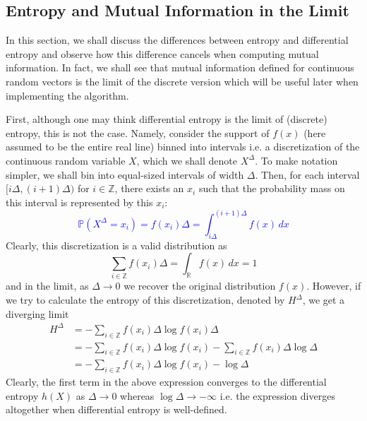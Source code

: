 \documentclass[../Thesis.tex]{subfiles}
\begin{document}
\subsection{Entropy and Mutual Information in the Limit}\label{subsec:limit entropy and MI}
In this section, we shall discuss the differences between entropy and differential entropy and observe how this difference cancels when computing mutual information. In fact, we shall see that mutual information defined for continuous random vectors is the limit of the discrete version which will be useful later when implementing the algorithm.

First, although one may think differential entropy is the limit of (discrete) entropy, this is not the case. Namely, consider the support of $f(x)$ (here assumed to be the entire real line) binned into intervals i.e. a discretization of the continuous random variable $X$, which we shall denote $X^{\Delta}$. To make notation simpler, we shall bin into equal-sized intervals of width $\Delta$. Then, for each interval $[i\Delta, (i+1)\Delta)$ for $i \in \mathbb{Z}$, there exists an $x_i$ such that the probability mass on this interval is represented by this $x_i$:
\textcolor{blue}{
    \begin{equation}\label{eq:one dim discretization}
        \mathbb{P}\left(X^{\Delta} = x_i\right) = f(x_i) \Delta = \int_{i\Delta}^{(i+1)\Delta} f(x) \, dx
    \end{equation}
}
Clearly, this discretization is a valid distribution as
$$\sum_{i\in\mathbb{Z}} f(x_i) \Delta = \int_{\mathbb{R}} f(x) \, dx = 1$$
and in the limit, as $\Delta \to 0$ we recover the original distribution $f(x)$. However, if we try to calculate the entropy of this discretization, denoted by $H^{\Delta}$, we get a diverging limit
\begin{align*}
    H^{\Delta} & = -\sum_{i\in\mathbb{Z}} f(x_i) \Delta \log{f(x_i) \Delta}                                             \\
               & = -\sum_{i\in\mathbb{Z}} f(x_i) \Delta \log{f(x_i)} - \sum_{i\in\mathbb{Z}} f(x_i) \Delta \log{\Delta} \\
               & = -\sum_{i\in\mathbb{Z}} f(x_i) \Delta \log{f(x_i)} - \log{\Delta}
\end{align*}
Clearly, the first term in the above expression converges to the differential entropy $h\left(X\right)$ as $\Delta \to 0$ whereas $\log{\Delta} \to - \infty$ i.e. the expression diverges altogether when differential entropy is well-defined.
\end{document}
